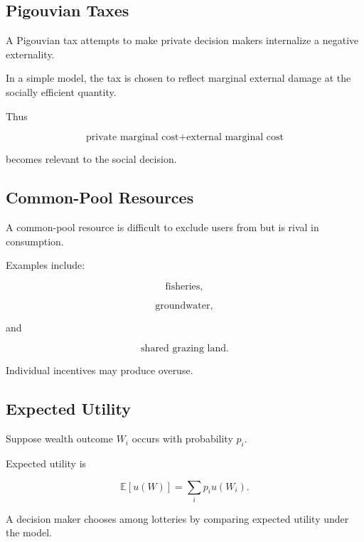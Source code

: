 \subsection{Pigouvian Taxes}
\label{subsec:pigouvian-taxes}

A Pigouvian tax attempts to make private decision makers internalize a
negative externality.

In a simple model, the tax is chosen to reflect marginal external damage at
the socially efficient quantity.

Thus

\[
\boxed{
\text{private marginal cost}
+
\text{external marginal cost}
}
\]

becomes relevant to the social decision.

\subsection{Common-Pool Resources}
\label{subsec:common-pool-resources}

A common-pool resource is difficult to exclude users from but is rival in
consumption.

Examples include:

\[
\boxed{
\text{fisheries},
}
\]

\[
\boxed{
\text{groundwater},
}
\]

and

\[
\boxed{
\text{shared grazing land}.
}
\]

Individual incentives may produce overuse.

\subsection{Expected Utility}
\label{subsec:expected-utility-economics}

Suppose wealth outcome \(W_i\) occurs with probability \(p_i\).

Expected utility is

\[
\boxed{
\mathbb{E}[u(W)]
=
\sum_i
p_i u(W_i).
}
\]

A decision maker chooses among lotteries by comparing expected utility under
the model.

